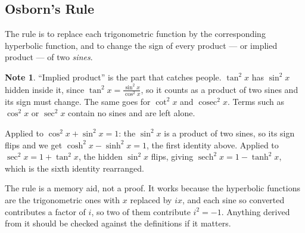 \documentclass[11pt,a4paper]{article}
\theoremstyle{definition}
\newtheorem{note}[thm]{Note}
\begin{document}
\subsection{Osborn's Rule}
The rule is to replace each trigonometric function by the corresponding hyperbolic
function, and to change the sign of every product --- or implied product --- of two
\emph{sines}.

\begin{note}
``Implied product'' is the part that catches people. $\tan^{2}x$ has $\sin^{2}x$
hidden inside it, since $\tan^{2}x=\frac{\sin^{2}x}{\cos^{2}x}$, so it counts as a
product of two sines and its sign must change. The same goes for $\cot^{2}x$ and
$\operatorname{cosec}^{2}x$. Terms such as $\cos^{2}x$ or $\sec^{2}x$ contain no
sines and are left alone.

Applied to $\cos^{2}x+\sin^{2}x=1$: the $\sin^{2}x$ is a product of two sines, so
its sign flips and we get $\cosh^{2}x-\sinh^{2}x=1$, the first identity above.
Applied to $\sec^{2}x=1+\tan^{2}x$, the hidden $\sin^{2}x$ flips, giving
$\operatorname{sech}^{2}x=1-\tanh^{2}x$, which is the sixth identity rearranged.

The rule is a memory aid, not a proof. It works because the hyperbolic functions
are the trigonometric ones with $x$ replaced by $ix$, and each sine so converted
contributes a factor of $i$, so two of them contribute $i^{2}=-1$. Anything
derived from it should be checked against the definitions if it matters.
\end{note}
\end{document}
